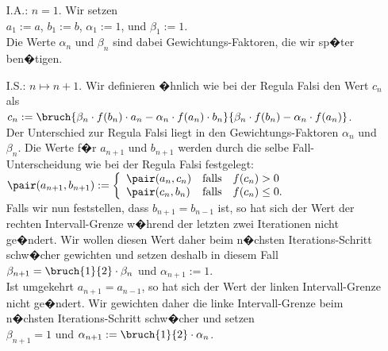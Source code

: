\begin{enumerate}
\item[I.A.:] $n=1$.  Wir setzen 
             \\[0.2cm]
             \hspace*{1.3cm}
             $a_1 := a$, \quad $b_1 := b$, \quad $\alpha_1 := 1$, \quad und \quad $\beta_1 := 1$.
             \\[0.2cm]
             Die Werte $\alpha_n$ und $\beta_n$ sind dabei Gewichtungs-Faktoren, die wir sp�ter ben�tigen.
\item[I.S.:] $n \mapsto n+1$.  Wir definieren �hnlich wie bei der Regula Falsi den Wert $c_n$ als \\[0.2cm]
      \hspace*{1.3cm} 
      $c_n := \bruch{\beta_n \cdot f(b_n) \cdot a_n - \alpha_n \cdot f(a_n) \cdot b_n}{
                     \beta_n \cdot f(b_n) - \alpha_n \cdot f(a_n)}
      $. 
      \\[0.3cm]
      Der Unterschied zur Regula Falsi liegt in den Gewichtungs-Faktoren $\alpha_n$ und $\beta_n$.
      Die Werte f�r $a_{n+1}$ und $b_{n+1}$ werden durch die selbe Fall-Unterscheidung wie bei der Regula
      Falsi festgelegt:
      \\[0.2cm]
      \hspace*{1.3cm}
      $\pair(a_{n+1},b_{n+1}) := 
         \left\{ \begin{array}{ll}
                 \pair(a_n,c_n) & \mbox{falls}\quad f(c_n) >    0 \\
                 \pair(c_n,b_n) & \mbox{falls}\quad f(c_n) \leq 0. \\
                 \end{array}
         \right.
      $
      \\[0.2cm]
      Falls wir nun feststellen, dass $b_{n+1} = b_{n-1}$ ist, so hat sich der Wert der rechten
      Intervall-Grenze w�hrend der letzten zwei Iterationen nicht ge�ndert.  Wir wollen diesen Wert
      daher beim n�chsten Iterations-Schritt 
      schw�cher gewichten und setzen deshalb in diesem Fall
      \\[0.2cm]
      \hspace*{1.3cm}
      $\beta_{n+1} = \bruch{1}{2} \cdot \beta_n$ \quad und \quad $\alpha_{n+1} := 1$.
      \\[0.2cm]
      Ist umgekehrt $a_{n+1} = a_{n-1}$, so hat sich der Wert der linken
      Intervall-Grenze nicht ge�ndert.  Wir gewichten daher die linke Intervall-Grenze beim n�chsten
      Iterations-Schritt schw�cher und setzen 
      \\[0.2cm]
      \hspace*{1.3cm}
      $\beta_{n+1} = 1$ \quad und \quad $\alpha_{n+1} := \bruch{1}{2} \cdot \alpha_n$.
\end{enumerate}
